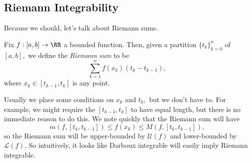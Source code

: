 \subsection{Riemann Integrability}
Because we should, let's talk about Riemann sums.
\begin{definition}
	Fix $f:[a,b]\to\RR$ a bounded function. Then, given a partition $\{t_k\}_{k=0}^n$ of $[a,b],$ we define the \textit{Riemann sum} to be
	\[\sum_{k=1}^nf(x_k)(t_k-t_{k-1}),\]
	where $x_k\in[t_{k-1},t_k]$ is any point.
\end{definition}
Usually we place some conditions on $x_k$ and $t_k,$ but we don't have to. For example, we might require the $[t_{k-1},t_k]$ to have equal length, but there is no immediate reason to do this. We note quickly that the Riemann sum will have
\[m(f,[t_k,t_{k-1}])\le f(x_k)\le M(f,[t_k,t_{k-1}]),\]
so the Riemann sum will be upper-bounded by $\mathcal U(f)$ and lower-bounded by $\mathcal L(f).$ So intuitively, it looks like Darboux integrable will easily imply Riemann integrable.

